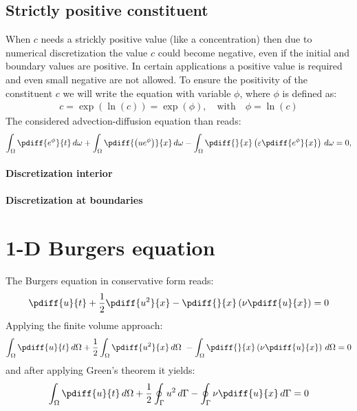 \subsection{Strictly positive constituent}\label{sec:1d_adv_diff_poss_equation}

When $c$ needs a strickly positive value (like a concentration) then due to numerical discretization the value $c$ could become negative, even if the initial and boundary values are positive.
In certain applications a positive value is required and even small negative are not allowed.
To ensure the positivity of the constituent $c$ we will write the equation with variable $\phi$, where $\phi$ is defined as:
\begin{align}
    c = \exp(\ln(c)) =  \exp(\phi), \quad \text{with} \quad \phi = \ln(c)
\end{align}
The considered advection-diffusion equation than reads:
\begin{align}
    \int_\Omega\pdiff{{e^\phi}}{t} \, d\omega
    + \int_\Omega\pdiff{\left(u{e^\phi}\right)}{x} \, d\omega
    - \int_\Omega\pdiff{}{x}\left(\eps \pdiff{{e^\phi}}{x}\right)\, d\omega = 0,\label{eq:1d_advec_phi}
\end{align}
\paragraph*{Discretization interior}
\notyet
\paragraph*{Discretization at boundaries}
\notyet
\section{1-D Burgers equation}
The Burgers equation in conservative form reads:
\begin{align}
    \pdiff{u}{t} + \half \pdiff{u^2}{x} - \pdiff{}{x} \left( \nu \pdiff{u}{x} \right) = 0 \label{eq:1d_burgers}
\end{align}
Applying the finite volume approach:
\begin{align}
    \int_\Omega \pdiff{u}{t}\, d\Omega + \half \int_\Omega \pdiff{u^2}{x}\, d\Omega \ - \int_\Omega  \pdiff{}{x} \left( \nu \pdiff{u}{x} \right)\, d\Omega = 0
\end{align}
and after applying Green's theorem it yields:
\begin{align}
    \int_\Omega \pdiff{u}{t}\, d\Omega + \half \oint_\Gamma u^2\, d\Gamma
    - \oint_\Gamma  \nu \pdiff{u}{x} \, d\Gamma = 0
\end{align}

